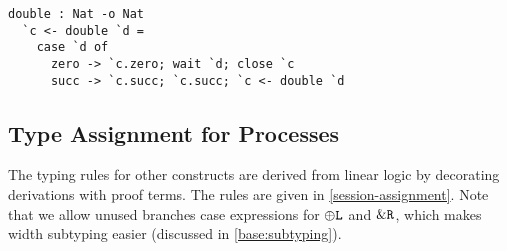 \begin{lstlisting}[language=krill, style=custom]
  double : Nat -o Nat
  `c <- double `d =
    case `d of
      zero -> `c.zero; wait `d; close `c
      succ -> `c.succ; `c.succ; `c <- double `d
\end{lstlisting}


\subsection{Type Assignment for Processes}
\label{base:type-assignment}

The typing rules for other constructs are derived from linear logic by decorating derivations with proof terms. The rules are given in \cref{session-assignment}. Note that we allow unused branches case expressions for $\oplus\texttt{L}$ and $\&\texttt{R}$, which makes width subtyping easier (discussed in \cref{base:subtyping}).


